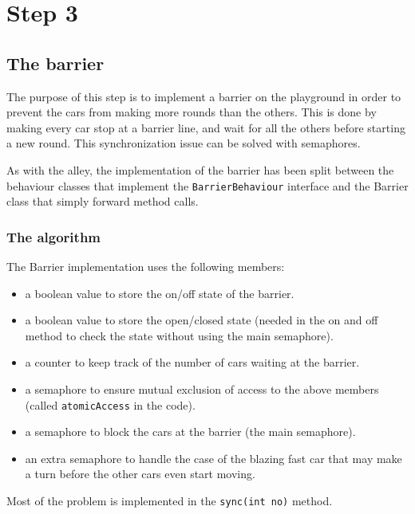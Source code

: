 
\section{Step 3}
\subsection{The barrier} %

The purpose of this step is to implement a barrier on the playground in order to
prevent the cars from making more rounds than the others. This is done by making
every car stop at a barrier line, and wait for all the others before starting a
new round. This synchronization issue can be solved with semaphores.

As with the alley, the implementation of the barrier has been split between the
behaviour classes that implement the \texttt{BarrierBehaviour} interface and the 
Barrier class that simply forward method calls.

\subsubsection{The algorithm}

The Barrier implementation uses the following members:
\begin{itemize}
    \item a boolean value to store the on/off state of the barrier.
    \item a boolean value to store the open/closed state (needed in the on and
    off method to check the state without using the main semaphore).
    \item a counter to keep track of the number of cars waiting at the barrier.
    \item a semaphore to ensure mutual exclusion of access to the above members
    (called \texttt{atomicAccess} in the code).
    \item a semaphore to block the cars at the barrier (the main semaphore).
    \item an extra semaphore to handle the case of the blazing fast car that may
    make a turn before the other cars even start moving.
\end{itemize}

Most of the problem is implemented in the \texttt{sync(int no)} method. 

